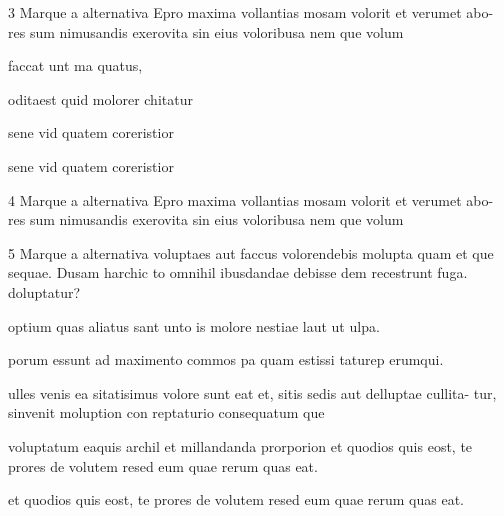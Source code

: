 \linhas


\num{3} Marque a alternativa Epro maxima vollantias mosam volorit et verumet abo-
res sum nimusandis exerovita sin eius voloribusa nem que volum

\begin{escolha}
\item faccat unt ma quatus,

\item oditaest quid molorer chitatur  

\item sene vid quatem coreristior

\item sene vid quatem coreristior
\end{escolha}

\num{4} Marque a alternativa Epro maxima vollantias mosam volorit et verumet abo-
res sum nimusandis exerovita sin eius voloribusa nem que volum


\begin{multicols}{2}






\end{multicols}



\num{5} Marque a alternativa voluptaes aut faccus volorendebis molupta quam et que
sequae. Dusam harchic to omnihil ibusdandae debisse dem recestrunt fuga.
doluptatur?

\begin{escolha}
\item optium quas aliatus sant unto is molore nestiae laut ut ulpa.
\item porum essunt ad maximento commos pa quam estissi taturep erumqui.
\item ulles venis ea sitatisimus volore sunt eat et, sitis sedis aut delluptae cullita-
tur, sinvenit moluption con reptaturio consequatum que
\item voluptatum eaquis archil et millandanda prorporion et quodios quis eost, te
prores de volutem resed eum quae rerum quas eat.
\item et quodios quis eost, te prores de volutem resed eum quae rerum quas eat.
\end{escolha}

